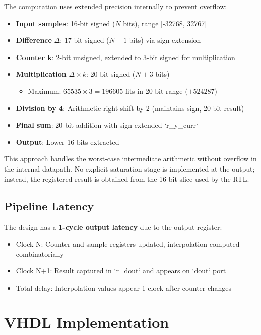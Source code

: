\documentclass[a4paper,11pt]{article}
\begin{document}
The computation uses extended precision internally to prevent overflow:
\begin{itemize}
    \item \textbf{Input samples}: 16-bit signed ($N$ bits), range [-32768, 32767]
    \item \textbf{Difference} $\Delta$: 17-bit signed ($N+1$ bits) via sign extension
    \item \textbf{Counter k}: 2-bit unsigned, extended to 3-bit signed for multiplication
    \item \textbf{Multiplication} $\Delta \times k$: 20-bit signed ($N+3$ bits)
    \begin{itemize}
        \item Maximum: $65535 \times 3 = 196605$ fits in 20-bit range ($\pm 524287$)
    \end{itemize}
    \item \textbf{Division by 4}: Arithmetic right shift by 2 (maintains sign, 20-bit result)
    \item \textbf{Final sum}: 20-bit addition with sign-extended `r\_y\_curr`
    \item \textbf{Output}: Lower 16 bits extracted
\end{itemize}

This approach handles the worst-case intermediate arithmetic without overflow in the internal datapath. No explicit saturation stage is implemented at the output; instead, the registered result is obtained from the 16-bit slice used by the RTL.

\subsection{Pipeline Latency}

The design has a \textbf{1-cycle output latency} due to the output register:
\begin{itemize}
    \item Clock N: Counter and sample registers updated, interpolation computed combinatorially
    \item Clock N+1: Result captured in `r\_dout` and appears on `dout` port
    \item Total delay: Interpolation values appear 1 clock after counter changes
\end{itemize}

\newpage
\section{VHDL Implementation}
\end{document}
